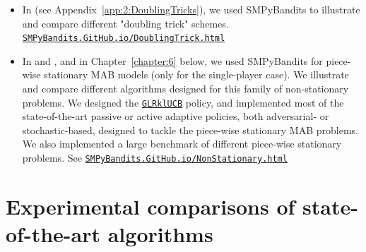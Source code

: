 \begin{itemize}
    \item
In \cite{Besson2018DoublingTricks} (see Appendix~\ref{app:2:DoublingTricks}), we used SMPyBandits to illustrate and compare different "doubling trick" schemes.
\texttt{\href{https://SMPyBandits.GitHub.io/DoublingTrick.html}{SMPyBandits.GitHub.io/DoublingTrick.html}}

    \item
In \cite{Besson2019GLRT} and \cite{Besson2019Gretsi}, and in Chapter~\ref{chapter:6} below, we used SMPyBandits for piece-wise stationary MAB models (only for the single-player case). We illustrate and compare different algorithms designed for this family of non-stationary problems.
We designed the \texttt{\href{https://SMPyBandits.GitHub.io/docs/Policies.GLR_UCB.html}{GLRklUCB}} policy, and implemented most of the state-of-the-art passive or active adaptive policies, both adversarial- or stochastic-based, designed to tackle the piece-wise stationary MAB problems.
We also implemented a large benchmark of different piece-wise stationary problems.
See \texttt{\href{https://SMPyBandits.GitHub.io/NonStationary.html}{SMPyBandits.GitHub.io/NonStationary.html}}
\end{itemize}


\section{Experimental comparisons of state-of-the-art algorithms}
\label{sec:3:reviewSPAlgorithms}

